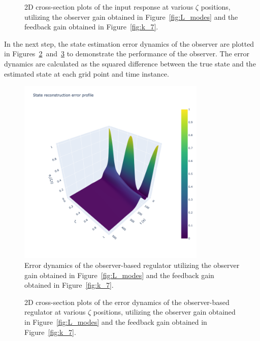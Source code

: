 \begin{figure}[!htbp]
    \centering
    
    \caption{2D cross-section plots of the input response at various $\zeta$ positions, utilizing the observer gain obtained in Figure~\ref{fig:L_modes} and the feedback gain obtained in Figure~\ref{fig:k_7}.}
    \label{fig:2D_xt_L_k7}
\end{figure}

In the next step, the state estimation error dynamics of the observer are plotted in Figures~\ref{fig:3D_e1_L_k7}~and~\ref{fig:2D_et_L_k7} to demonstrate the performance of the observer. The error dynamics are calculated as the squared difference between the true state and the estimated state at each grid point and time instance.

\begin{figure}[!htbp]
    \centering
    \includegraphics[width=0.8\textwidth,trim=0 0 100 0,clip]{Figures/3D_e1_L_k7.png}
    \caption{Error dynamics of the observer-based regulator utilizing the observer gain obtained in Figure~\ref{fig:L_modes} and the feedback gain obtained in Figure~\ref{fig:k_7}.}
    \label{fig:3D_e1_L_k7}
\end{figure}

\begin{figure}[!htbp]
    \centering
    
    \caption{2D cross-section plots of the error dynamics of the observer-based regulator at various $\zeta$ positions, utilizing the observer gain obtained in Figure~\ref{fig:L_modes} and the feedback gain obtained in Figure~\ref{fig:k_7}.}
    \label{fig:2D_et_L_k7}
\end{figure}

